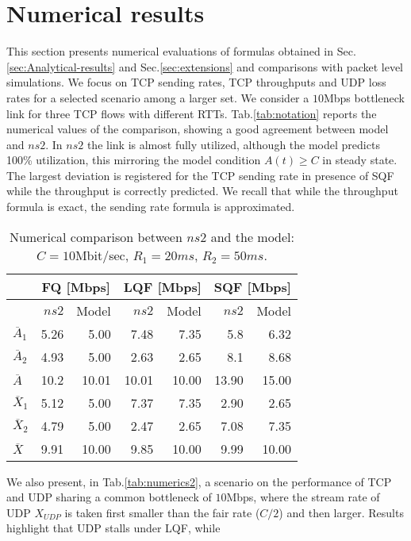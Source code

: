 \documentclass[a4paper,oneside, 11pt]{article}
\begin{document}
\section{Numerical results}\label{sec:numerics}
This section presents numerical evaluations of formulas obtained
in Sec.\ref{sec:Analytical-results} and Sec.\ref{sec:extensions}
and comparisons with packet level simulations.
We focus on TCP sending rates, TCP throughputs and UDP loss rates
for a selected scenario among a larger set.
We consider a $10$Mbps bottleneck link for three TCP flows with different
RTTs. Tab.\ref{tab:notation} reports the numerical values of the
comparison, showing a good agreement between model and $ns2$.
In $ns2$ the link is almost fully utilized, although the model predicts
100\% utilization, this mirroring the model condition $A(t)\ge C$ in steady state.
The largest deviation
is registered for the TCP sending rate in presence of SQF while
the throughput is correctly predicted. We recall that while the throughput
formula is exact, the sending rate formula is approximated.
\begin{table}
\centering
\begin{tabular}{|l|rr|rr|rr|}
\hline
& \multicolumn{2}{|c}{{FQ [Mbps]}} & \multicolumn{2}{|c}{{LQF [Mbps]}} &\multicolumn{2}{|c|}{{SQF [Mbps]}} \\
\hline
\hline
& $ns2$ & Model& $ns2$ & Model& $ns2$ & Model\\
$\overline{A}_1$  & 5.26 & 5.00 & 7.48 & 7.35 & 5.8 & 6.32 \\
$\overline{A}_2$  & 4.93 & 5.00 & 2.63 & 2.65 & 8.1 & 8.68 \\
$\overline{A}$    & 10.2 & 10.01 & 10.01 & 10.00 & 13.90 &  15.00\\
$\overline{X}_1$ & 5.12 & 5.00 & 7.37 & 7.35 & 2.90 & 2.65 \\
$\overline{X}_2$ & 4.79 & 5.00 & 2.47 & 2.65 & 7.08 & 7.35 \\
$\overline{X}$ & 9.91 & 10.00  & 9.85 & 10.00 & 9.99 & 10.00 \\
\hline
\end{tabular}
\caption{Numerical comparison between $ns2$ and the model: $C=10$Mbit/sec, $R_1=20ms$, $R_2=50ms$.}
\label{tab:numerics}
\end{table}
We also present, in Tab.\ref{tab:numerics2}, a scenario on the performance of TCP and UDP  sharing a common bottleneck
of $10$Mbps, where the stream rate of UDP $X_{UDP}$ is taken first smaller than the fair rate ($C/2$) and then
larger. Results highlight that UDP stalls under LQF, while
\end{document}
